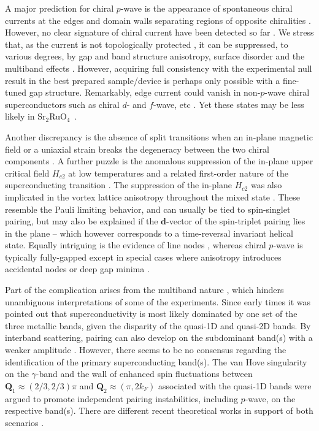 \documentclass[aps,prl,twocolumn,superscriptaddress,showpacs]{revtex4-1}
\newcommand{\bs}{\boldsymbol}
\newcommand{\SRO}{Sr$_2$RuO$_4$}
\begin{document}
A major prediction for chiral $p$-wave is the appearance of spontaneous chiral currents at the edges and domain walls separating regions of opposite chiralities \cite{Matsumoto:99,Furusaki:01}. However, no clear signature of chiral current have been detected so far \cite{Kirtley:07,Hicks:10,Curran:14}. We stress that, as the current is not topologically protected \cite{Huang:15}, it can be suppressed, to various degrees, by gap and band structure anisotropy, surface disorder and the multiband effects \cite{Ashby:09,Imai:12,Bouhon:14,Lederer:14,Scaffidi:15,Huang:15,Etter:17}. However, acquiring full consistency with the experimental null result in the best prepared sample/device is perhaps only possible with a fine-tuned gap structure. Remarkably, edge current could vanish in non-$p$-wave chiral superconductors such as chiral $d$- and $f$-wave, etc \cite{Huang:14,Tada:15,Ojanen:16,Suzuki:16}. Yet these states may be less likely in \SRO~\cite{Huang:14}.

Another discrepancy is the absence of split transitions when an in-plane magnetic field or a uniaxial strain breaks the degeneracy between the two chiral components \cite{Sigrist:91,Yonezawa:14,Hicks:14,Steppke:17,Liu:17,Hsu:16,Liu:13}. A further puzzle is the anomalous suppression of the in-plane upper critical field $H_{c2}$ \cite{Deguchi:02} at low temperatures and a related first-order nature of the superconducting transition \cite{Yonezawa:13,Yonezawa:14,Kittaka:14}. The suppression of the in-plane $H_{c2}$ was also implicated in the vortex lattice anisotropy throughout the mixed state \cite{Rastovski:13,Kuhn:17}. These resemble the Pauli limiting behavior, and can usually be tied to spin-singlet pairing, but may also be explained if the ${\bs d}$-vector of the spin-triplet pairing lies in the plane  -- which however corresponds to a time-reversal invariant helical state. Equally intriguing is the evidence of line nodes \cite{Ishida:97,NishiZaki:00,Hassinger:16}, whereas chiral $p$-wave is typically fully-gapped except in special cases where anisotropy introduces accidental nodes or deep gap minima \cite{Kivelson:13}.

Part of the complication arises from the multiband nature \cite{Deguchi:04}, which hinders unambiguous interpretations of some of the experiments. Since early times it was pointed out \cite{Agterberg:97} that superconductivity is most likely dominated by one set of the three metallic bands, given the disparity of the quasi-1D and quasi-2D bands. By interband scattering, pairing can also develop on the subdominant band(s) with a weaker amplitude \cite{Zhitomirsky:01}. However, there seems to be no consensus regarding the identification of the primary superconducting band(s). The van Hove singularity on the $\gamma$-band and the wall of enhanced spin fluctuations between $\bs Q_1 \approx (2/3,2/3)\pi$ and $\bs Q_2 \approx (\pi,2k_F)$ associated with the quasi-1D bands \cite{Imai:98,Braden:02,Mazin:99} were argued to promote independent pairing instabilities, including $p$-wave, on the respective band(s). There are different recent theoretical works in support of both scenarios \cite{Raghu:10,Huo:13,Wang:13,Tsuchiizu:15}.
\end{document}
